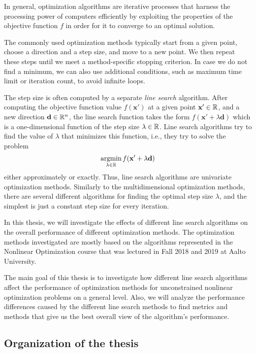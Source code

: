 \documentclass[english, 12pt, a4paper, sci, utf8, a-1b, online, table]{aaltothesis}
\newcommand{\vect}[1]{\ensuremath{\mathbf{#1}}}
\newcommand{\R}{\ensuremath\mathbb{R}}
\begin{document}
In general, optimization algorithms are iterative processes that harness the processing power of computers efficiently by exploiting the properties of the objective function $f$ in order for it to converge to an optimal solution.

The commonly used optimization methods typically start from a given point, choose a direction and a step size, and move to a new point. We then repeat these steps until we meet a method-specific stopping criterion. In case we do not find a minimum, we can also use additional conditions, such as maximum time limit or iteration count, to avoid infinite loops.

The step size is often computed by a separate \emph{line search} algorithm. After computing the objective function value $f(\vect{x}')$ at a given point $\vect{x}'\in \R$, and a new direction $\vect{d}\in \R^n$, the line search function takes the form $f(\vect{x}' + \lambda \vect{d})$ which is a one-dimensional function of the step size $\lambda\in \R$. Line search algorithms try to find the value of $\lambda$ that minimizes this function, i.e., they try to solve the problem
\begin{equation}\label{eq:ls}
\mathop{\text{argmin}}_{\lambda\in \R} f(\vect{x}' + \lambda \vect{d})
\end{equation}
either approximately or exactly. Thus, line search algorithms are univariate optimization methods. Similarly to the multidimensional optimization methods, there are several different algorithms for finding the optimal step size $\lambda$, and the simplest is just a constant step size for every iteration. 

In this thesis, we will investigate the effects of different line search algorithms on the overall performance of different optimization methods. The optimization methods investigated are mostly based on the algorithms represented in the Nonlinear Optimization course that was lectured in Fall 2018 and 2019 at Aalto University.

The main goal of this thesis is to investigate how different line search algorithms affect the performance of optimization methods for unconstrained nonlinear optimization problems on a general level. Also, we will analyze the performance differences caused by the different line search methods to find metrics and methods that give us the best overall view of the algorithm's performance.

\subsection{Organization of the thesis}
\end{document}
